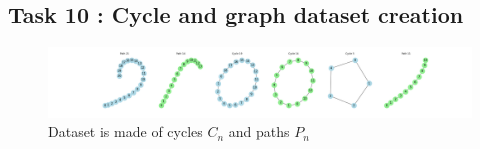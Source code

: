 \documentclass[a4paper]{article}
\begin{document}
\subsection*{Task 10 : Cycle and graph dataset creation}

\begin{figure}[ht]
        \centering
        \includegraphics[width=1.\textwidth]{figures/cycle_and_paths_dataset.png}
        \caption{Dataset is made of cycles $C_n$ and paths $P_n$}
        \label{fig:cycle_and_paths_dataset}
\end{figure}



\pagebreak



\end{document}
